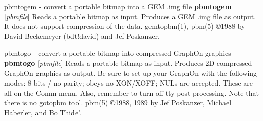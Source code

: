 %

\newpage
%

pbmtogem - convert a portable bitmap into a GEM .img file
{\bf pbmtogem}
{\rm [}{\it pbmfile}{\rm ]}
Reads a portable bitmap as input.
Produces a GEM .img file as output.
It does not support compression of the data.
gemtopbm(1), pbm(5)
\copyright 1988 by David Beckemeyer (bdt!david) and Jef Poskanzer.
%
 
%

\newpage
%

pbmtogo - convert a portable bitmap into compressed GraphOn graphics
{\bf pbmtogo}
{\rm [}{\it pbmfile}{\rm ]}
Reads a portable bitmap as input.
Produces 2D compressed GraphOn graphics as output.
Be sure to set up your GraphOn with the following modes: 8 bits / no parity;
obeys no XON/XOFF; NULs are accepted.  These are all on the Comm menu.
Also, remember to turn off tty post processing.
Note that there is no gotopbm tool.
pbm(5)
\copyright 1988, 1989 by Jef Poskanzer, Michael Haberler, and Bo Thide'.
%
 
